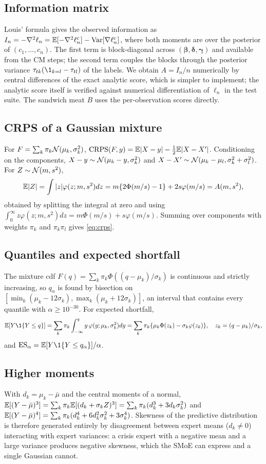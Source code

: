 \subsection{Information matrix}
Louis' formula gives the observed information as
$I_n=-\nabla^2\ell_n=\mathbb{E}[-\nabla^2\ell^c_n]-\operatorname{Var}[\nabla\ell^c_n]$, where both moments are over the
posterior of $(c_1,\dots,c_n)$. The first term is block-diagonal across $(\bm\beta,\bm\delta,\bm\gamma)$
and available from the CM steps; the second term couples the blocks through the posterior variance
$\tau_{tk}(\1_{k=l}-\tau_{tl})$ of the labels. We obtain $A=I_n/n$ numerically by central differences of
the exact analytic score, which is simpler to implement; the analytic score itself is verified against
numerical differentiation of $\ell_n$ in the test suite. The sandwich meat $B$ uses the per-observation
scores directly.

\subsection{CRPS of a Gaussian mixture}
For $F=\sum_k\pi_k\mathcal{N}(\mu_k,\sigma_k^2)$, $\mathrm{CRPS}(F,y)=\mathbb{E}|X-y|-\tfrac12\mathbb{E}|X-X'|$. Conditioning on
the components, $X-y\sim\mathcal{N}(\mu_k-y,\sigma_k^2)$ and $X-X'\sim\mathcal{N}(\mu_k-\mu_l,\sigma_k^2+\sigma_l^2)$.
For $Z\sim\mathcal{N}(m,s^2)$,
\[
\mathbb{E}|Z|=\int|z|\varphi(z;m,s^2)dz=m\{2\Phi(m/s)-1\}+2s\varphi(m/s)=A(m,s^2),
\]
obtained by splitting the integral at zero and using $\int_0^\infty z\varphi(z;m,s^2)dz=m\Phi(m/s)+s\varphi(m/s)$.
Summing over components with weights $\pi_k$ and $\pi_k\pi_l$ gives \eqref{eq:crps}.

\subsection{Quantiles and expected shortfall}
The mixture cdf $F(q)=\sum_k\pi_k\Phi((q-\mu_k)/\sigma_k)$ is continuous and strictly increasing, so
$q_\alpha$ is found by bisection on $[\min_k(\mu_k-12\sigma_k),\max_k(\mu_k+12\sigma_k)]$, an
interval that contains every quantile with $\alpha\ge10^{-30}$. For expected shortfall,
\[
\E[Y\1\{Y\le q\}]=\sum_k\pi_k\int_{-\infty}^qy\,\varphi(y;\mu_k,\sigma_k^2)dy
=\sum_k\pi_k\{\mu_k\Phi(z_k)-\sigma_k\varphi(z_k)\},\quad z_k=(q-\mu_k)/\sigma_k,
\]
and $\mathrm{ES}_\alpha=\E[Y\1\{Y\le q_\alpha\}]/\alpha$.

\subsection{Higher moments}
With $d_k=\mu_k-\bar\mu$ and the central moments of a normal, $\mathbb{E}[(Y-\bar\mu)^3]=\sum_k\pi_k\mathbb{E}[(d_k+\sigma_kZ)^3]
=\sum_k\pi_k(d_k^3+3d_k\sigma_k^2)$ and $\mathbb{E}[(Y-\bar\mu)^4]=\sum_k\pi_k(d_k^4+6d_k^2\sigma_k^2+3\sigma_k^4)$.
Skewness of the predictive distribution is therefore generated entirely by disagreement between
expert means ($d_k\neq0$) interacting with expert variances: a crisis expert with a negative mean and a
large variance produces negative skewness, which the SMoE can express and a single Gaussian cannot.

